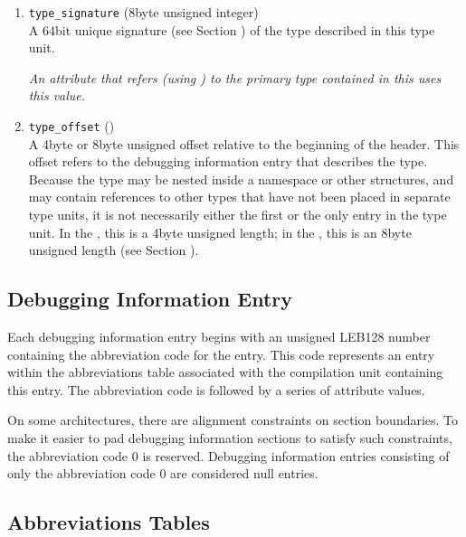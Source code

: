 \begin{enumerate}[1. ]
\item \texttt{type\_signature} (8\dash byte unsigned integer) \\
A 
64\dash bit unique signature (see Section 
)
of the type described in this type
unit.  

\textit{An attribute that refers (using 
) to
the primary type contained in this 
 uses this value.}


\item \texttt{type\_offset} () \\
A 4\dash byte or 8\dash byte unsigned offset 
relative to the beginning
of the  header.
This offset refers to the debugging
information entry that describes the type. Because the type
may be nested inside a namespace or other structures, and may
contain references to other types that have not been placed in
separate type units, it is not necessarily either the first or
the only entry in the type unit. In the \thirtytwobitdwarfformat,
this is a 4\dash byte unsigned length; in the \sixtyfourbitdwarfformat,
this is an 8\dash byte unsigned length
(see Section ).

\end{enumerate}

\subsection{Debugging Information Entry}
\label{datarep:debugginginformationentry}

Each debugging information entry begins with an unsigned LEB128
number containing the abbreviation code for the entry. This
code represents an entry within the abbreviations table
associated with the compilation unit containing this entry. The
abbreviation code is followed by a series of attribute values.

On some architectures, there are alignment constraints on
section boundaries. To make it easier to pad debugging
information sections to satisfy such constraints, the
abbreviation code 0 is reserved. Debugging information entries
consisting of only the abbreviation code 0 are considered
null entries.

\subsection{Abbreviations Tables}
\label{datarep:abbreviationstables}

